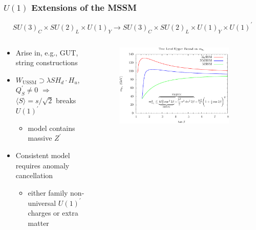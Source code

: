 \documentclass[10pt,aspectratio=169]{beamer}
\begin{document}
\begin{frame}
  \frametitle{$U(1)$ Extensions of the MSSM}
    \begin{equation*}
      SU(3)_C \times SU(2)_L \times U(1)_Y \to
      SU(3)_C \times SU(2)_L \times U(1)_Y \times U(1)^\prime
    \end{equation*}
    \vspace{-15pt}
  \begin{columns}[t]
    \begin{column}{0.45\textwidth}
      \begin{itemize} \itemsep1em
        \item Arise in, e.g., GUT, string constructions
        \item $W_{\text{USSM}} \supset \lambda S H_d
          \cdot H_u$, $Q^\prime_{S} \neq 0$ $\Rightarrow$
          $\langle S \rangle = s / \sqrt{2}$ breaks $U(1)^\prime$
          \begin{itemize}
            \item {\color{blue} model contains massive $Z^\prime$ }
          \end{itemize}
        \item Consistent model requires anomaly cancellation
          \begin{itemize}
            \item either family non-universal $U(1)^\prime$ charges
              or {\color{blue} extra matter}
          \end{itemize}
      \end{itemize}
    \end{column}
    \begin{column}{0.6\textwidth}
      \vspace{-10pt}
      \begin{figure}
        \centering
        \includegraphics[width=0.9\textwidth]{treelevel_higgs_upperbound_plot}

\end{figure}
\end{column}
\end{columns}
\end{frame}
\end{document}
